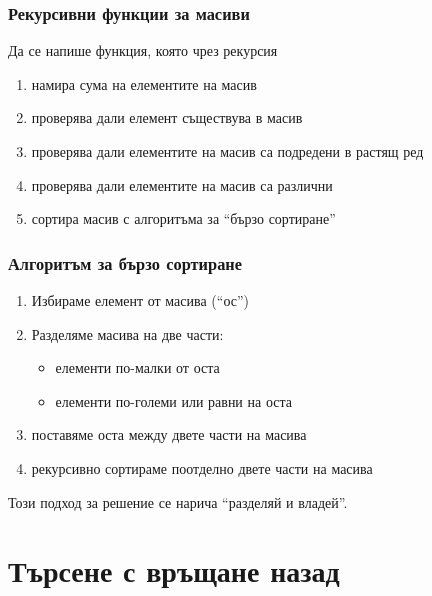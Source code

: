 \documentclass[alsotrans]{beamerswitch}
\begin{document}

\begin{frame}
  \frametitle{Рекурсивни функции за масиви}

  Да се напише функция, която чрез рекурсия
  \begin{enumerate}[<+->]
  \item намира сума на елементите на масив
  \item проверява дали елемент съществува в масив
  \item проверява дали елементите на масив са подредени в растящ ред
  \item проверява дали елементите на масив са различни
  \item сортира масив с алгоритъма за ``бързо сортиране''
  \end{enumerate}
\end{frame}

\begin{frame}
  \frametitle{Алгоритъм за бързо сортиране}

  \begin{enumerate}[<+->]
  \item Избираме елемент от масива (``ос'')
  \item Разделяме масива на две части:
    \begin{itemize}
    \item елементи по-малки от оста
    \item елементи по-големи или равни на оста
    \end{itemize}
  \item поставяме оста между двете части на масива
  \item \alert{рекурсивно} сортираме поотделно двете части на масива
  \end{enumerate}
  \onslide<+->
  Този подход за решение се нарича ``разделяй и владей''.
\end{frame}

\section{Търсене с връщане назад}
\end{document}
